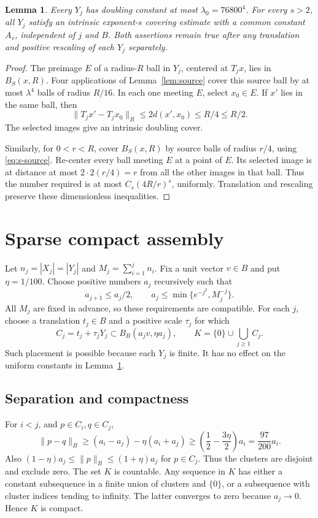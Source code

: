 \documentclass[11pt]{article}
\newtheorem{lemma}[theorem]{Lemma}
\theoremstyle{remark}
\newcommand{\norm}[1]{\lVert#1\rVert}
\begin{document}
\begin{lemma}\label{lem:uniform-cluster}
Every $Y_j$ has doubling constant at most $\lambda_0=76800^4$. For every $s>2$, all $Y_j$ satisfy an intrinsic exponent-$s$ covering estimate with a common constant $A_s$, independent of $j$ and $B$. Both assertions remain true after any translation and positive rescaling of each $Y_j$ separately.
\end{lemma}
\begin{proof}
The preimage $E$ of a radius-$R$ ball in $Y_j$, centered at $T_jx$, lies in $B_S(x,R)$. Four applications of Lemma~\ref{lem:source} cover this source ball by at most $\lambda^4$ balls of radius $R/16$. In each one meeting $E$, select $x_0\in E$. If $x'$ lies in the same ball, then
\[
 \norm{T_jx'-T_jx_0}_B\le2d(x',x_0)\le R/4\le R/2.
\]
The selected images give an intrinsic doubling cover.

Similarly, for $0<r<R$, cover $B_S(x,R)$ by source balls of radius $r/4$, using \eqref{eq:s-source}. Re-center every ball meeting $E$ at a point of $E$. Its selected image is at distance at most $2\cdot2(r/4)=r$ from all the other images in that ball. Thus the number required is at most $C_s(4R/r)^s$, uniformly. Translation and rescaling preserve these dimensionless inequalities.
\end{proof}

\section{Sparse compact assembly}\label{sec:assembly}
Let $n_j=|X_j|=|Y_j|$ and $M_j=\sum_{i=1}^j n_i$. Fix a unit vector $v\in B$ and put $\eta=1/100$. Choose positive numbers $a_j$ recursively such that
\begin{equation}\label{eq:placement-scales}
 a_{j+1}\le a_j/2,\qquad
 a_j\le\min\{e^{-j^2},M_j^{-j}\}.
\end{equation}
All $M_j$ are fixed in advance, so these requirements are compatible. For each $j$, choose a translation $t_j\in B$ and a positive scale $\tau_j$ for which
\[
 C_j=t_j+\tau_jY_j\subset B_B(a_jv,\eta a_j),
 \qquad K=\{0\}\cup\bigcup_{j\ge1}C_j.
\]
Such placement is possible because each $Y_j$ is finite. It has no effect on the uniform constants in Lemma~\ref{lem:uniform-cluster}.

\subsection{Separation and compactness}
For $i<j$, and $p\in C_i,q\in C_j$,
\begin{equation}\label{eq:separation}
 \norm{p-q}_B\ge(a_i-a_j)-\eta(a_i+a_j)
 \ge\left(\frac12-\frac{3\eta}{2}\right)a_i
 =\frac{97}{200}a_i.
\end{equation}
Also $(1-\eta)a_j\le\norm p_B\le(1+\eta)a_j$ for $p\in C_j$. Thus the clusters are disjoint and exclude zero. The set $K$ is countable. Any sequence in $K$ has either a constant subsequence in a finite union of clusters and $\{0\}$, or a subsequence with cluster indices tending to infinity. The latter converges to zero because $a_j\to0$. Hence $K$ is compact.
\end{document}
